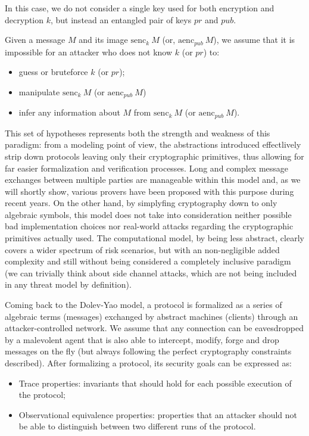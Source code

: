 \documentclass[fleqn,10pt]{SelfArx} %
\newcounter{definition}[section]\setcounter{definition}{0}
\begin{document}
In this case, we do not consider a single key used for both encryption and decryption $k$, but instead an entangled pair of keys $pr$ and $pub$.

Given a message $M$ and its image $\textrm{senc}_k\ M$ (or, $\textrm{aenc}_{pub}\ M$), we assume that it is impossible for an attacker who does not know $k$ (or $pr$) to:

\begin{itemize}
    \item guess or bruteforce $k$ (or $pr$);
    \item manipulate $\textrm{senc}_k\ M$ (or $\textrm{aenc}_{pub}\ M$)
    \item infer any information about $M$ from $\textrm{senc}_k\ M$ (or $\textrm{aenc}_{pub}\ M$).
\end{itemize}

This set of hypotheses represents both the strength and weakness of this paradigm: from a modeling point of view, the abstractions introduced effectlively strip down protocols leaving only their cryptographic primitives, thus allowing for far easier formalization and verification processes. Long and complex message exchanges between multiple parties are manageable within this model and, as we will shortly show, various provers have been proposed with this purpose during recent years. On the other hand, by simplyfing cryptography down to only algebraic symbols, this model does not take into consideration neither possible bad implementation choices nor real-world attacks regarding the cryptographic primitives actually used. The computational model, by being less abstract, clearly covers a wider spectrum of risk scenarios, but with an non-negligible added complexity and still without being considered a completely inclusive paradigm (we can trivially think about side channel attacks, which are not being included in any threat model by definition).

Coming back to the Dolev-Yao model, a protocol is formalized as a series of algebraic terms (messages) exchanged by abstract machines (clients) through an attacker-controlled network. We assume that any connection can be eavesdropped by a malevolent agent that is also able to intercept, modify, forge and drop messages on the fly (but always following the perfect cryptography constraints described). After formalizing a protocol, its security goals can be expressed as:

\begin{itemize}
    \item Trace properties: invariants that should hold for each possible execution of the protocol;
    \item Observational equivalence properties: properties that an attacker should not be able to distinguish between two different runs of the protocol.
\end{itemize}
\end{document}
